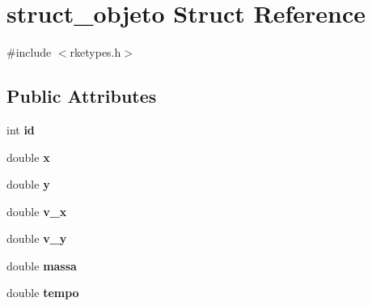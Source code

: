 \hypertarget{structstruct__objeto}{\section{struct\-\_\-objeto Struct Reference}
\label{structstruct__objeto}
}


{\ttfamily \#include $<$rketypes.\-h$>$}

\subsection*{Public Attributes}
\begin{DoxyCompactItemize}
\item 
\hypertarget{structstruct__objeto_ae9a037428a08fe5da343c4b1e7fd0fd3}{int {\bfseries id}}\label{structstruct__objeto_ae9a037428a08fe5da343c4b1e7fd0fd3}

\item 
\hypertarget{structstruct__objeto_a57918c6d0afe11d4ca083ce703d76b61}{double {\bfseries x}}\label{structstruct__objeto_a57918c6d0afe11d4ca083ce703d76b61}

\item 
\hypertarget{structstruct__objeto_aa8b1a98f80f1e829c62b5fffebd208e9}{double {\bfseries y}}\label{structstruct__objeto_aa8b1a98f80f1e829c62b5fffebd208e9}

\item 
\hypertarget{structstruct__objeto_a7c92e76fa78668f2c0af5a3175c75e02}{double {\bfseries v\-\_\-x}}\label{structstruct__objeto_a7c92e76fa78668f2c0af5a3175c75e02}

\item 
\hypertarget{structstruct__objeto_a390828a2ff2afc40b8cd5626f44b6359}{double {\bfseries v\-\_\-y}}\label{structstruct__objeto_a390828a2ff2afc40b8cd5626f44b6359}

\item 
\hypertarget{structstruct__objeto_a5a369e87a31b1d5c611f59edecaabe17}{double {\bfseries massa}}\label{structstruct__objeto_a5a369e87a31b1d5c611f59edecaabe17}

\item 
\hypertarget{structstruct__objeto_a2ebeaca5f84d6e41bcd8932c76ed3126}{double {\bfseries tempo}}\label{structstruct__objeto_a2ebeaca5f84d6e41bcd8932c76ed3126}

\end{DoxyCompactItemize}


